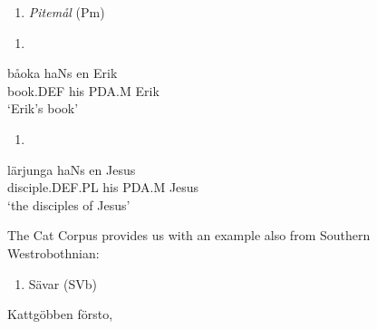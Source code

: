 \begin{enumerate} %
\item 
\textit{Pitemål }(Pm)
\end{enumerate} %
\setcounter{listLFOxcviiileveli}{0}
\begin{enumerate} %
\item 
\end{enumerate} %
\ea\label{}
\gll båoka  haNs  en  Erik  \\


book.DEF  his  PDA.M  Erik  \\ %


‘Erik’s book’
\z


\begin{enumerate} %
\item 
\end{enumerate} %
\ea\label{}
\gll lärjunga  haNs  en  Jesus\\


disciple.DEF.PL  his  PDA.M  Jesus\\ %


‘the disciples of Jesus’
\z


The Cat Corpus provides us with an example also from Southern Westrobothnian:

\begin{enumerate} %
\item 
Sävar (SVb)

\end{enumerate} %
\ea\label{}
\gll Kattgöbben  försto,\\


